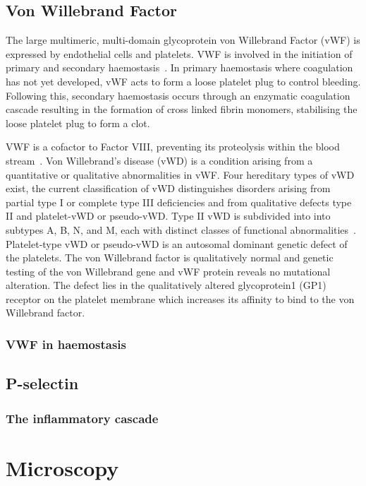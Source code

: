 \subsection{Von Willebrand Factor}
The large multimeric, multi-domain glycoprotein von Willebrand Factor (vWF) is expressed by endothelial cells and platelets. VWF is involved in the initiation of primary and secondary haemostasis~\cite{Metcalf2008}. In primary haemostasis where coagulation has not yet developed, vWF acts to form a loose platelet plug to control bleeding. Following this, secondary haemostasis occurs through an enzymatic coagulation cascade resulting in the formation of cross linked fibrin monomers, stabilising the loose platelet plug to form a clot.

VWF is a cofactor to Factor VIII, preventing its proteolysis within the blood stream~\cite{Sadler1998}. Von Willebrand's disease (vWD) is a condition arising from a quantitative or qualitative abnormalities in vWF. Four hereditary types of vWD exist, the current classification of vWD distinguishes disorders arising from partial type I or complete type III deficiencies and from qualitative defects type II and platelet-vWD or pseudo-vWD. Type II vWD is subdivided into into subtypes A, B, N, and M, each with distinct classes of functional abnormalities~\cite{Ewenstein1997}. Platelet-type vWD or pseudo-vWD is an autosomal dominant genetic defect of the platelets. The von Willebrand factor is qualitatively normal and genetic testing of the von Willebrand gene and vWF protein reveals no mutational alteration. The defect lies in the qualitatively altered glycoprotein1 (GP1) receptor on the platelet membrane which increases its affinity to bind to the von Willebrand factor. 
\subsubsection{VWF in haemostasis}

\subsection{P-selectin}
\subsubsection{The inflammatory cascade}

\section{Microscopy}


